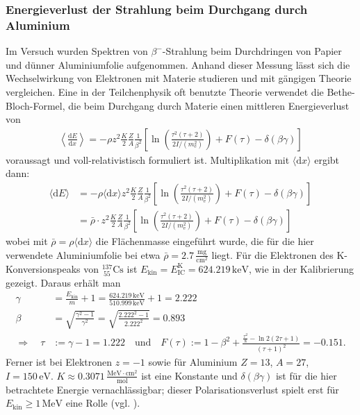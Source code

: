 \documentclass[german,  %
parskip=full,  %
]{scrartcl}
\begin{document}
\subsubsection{Energieverlust der Strahlung beim Durchgang durch Aluminium}
Im Versuch wurden Spektren von \(\beta^-\)-Strahlung beim Durchdringen von Papier und dünner Aluminiumfolie aufgenommen. Anhand dieser Messung lässt sich die Wechselwirkung von Elektronen mit Materie studieren und mit gängigen Theorie vergleichen. Eine in der Teilchenphysik oft benutzte Theorie verwendet die Bethe-Bloch-Formel, die beim Durchgang durch Materie einen mittleren Energieverlust von
\begin{align*}
\left \langle \frac{\mathrm{d}E}{\mathrm{d} x} \right \rangle= -\rho
z^2 \frac{K}{2} \frac{Z}{A} \frac{1}{\beta^2} \left[ \ln \left(\frac{\tau^2(\tau+2)}{2I/(m_{\mathrm{e}}^2)}\right)+F(\tau)- \delta(\beta \gamma)\right]
\end{align*}
voraussagt und voll-relativistisch formuliert ist. Multiplikation mit \(\langle\mathrm{d}x\rangle\) ergibt dann:
\begin{align*}
\langle \mathrm{d}E  \rangle &= -\rho\langle\mathrm{d} x\rangle 
z^2 \frac{K}{2} \frac{Z}{A} \frac{1}{\beta^2} \left[ \ln \left(\frac{\tau^2(\tau+2)}{2I/(m_{\mathrm{e}}^2)}\right)+F(\tau)- \delta(\beta \gamma)\right] \\
&= \bar{\rho}\cdot 
z^2 \frac{K}{2} \frac{Z}{A} \frac{1}{\beta^2} \left[ \ln \left(\frac{\tau^2(\tau+2)}{2I/(m_{\mathrm{e}}^2)}\right)+F(\tau)- \delta(\beta \gamma)\right] 
\end{align*}
wobei mit \(\bar{\rho}=\rho\langle\mathrm{d} x\rangle \) die Flächenmasse eingeführt wurde, die für die hier verwendete Aluminiumfolie bei etwa \(\bar{\rho} = 2.7\,\frac{\mathrm{mg}}{\mathrm{cm}^2}\) liegt. Für die Elektronen des K-Konversionspeaks von \(^{137}_{\ 55}\mathrm{Cs}\) ist \(E_{\mathrm{kin}}= E^\mathrm{K}_{\mathrm{IC}} = 624.219\,\mathrm{keV}\), wie in der Kalibrierung gezeigt. Daraus erhält man
\begin{align*}
\gamma &= \frac{E_{\mathrm{kin}}}{m} + 1 = \frac{624.219\,\mathrm{keV}}{510.999\,\mathrm{keV}} + 1 = 2.222 \\
\beta &= \sqrt{\frac{\gamma^2 - 1}{\gamma^2}} = \sqrt{\frac{2.222^2 - 1}{2.222^2}} = 0.893 \\
\Longrightarrow\quad \tau &:= \gamma -1 = 1.222\quad\text{und}\quad F(\tau) := 1 - \beta^2 + \frac{\frac{\tau^2}{8} - \ln 2(2\tau+1)}{(\tau + 1)^2} = -0.151.
\end{align*}
Ferner ist bei Elektronen \(z=-1\) sowie für Aluminium \(Z=13\), \(A=27\), \(I=150\,\mathrm{eV}\). \(K\approx0.3071\,\frac{\mathrm{MeV}\cdot\mathrm{cm^2}}{\mathrm{mol}}\) ist eine Konstante und \(\delta(\beta\gamma)\) ist für die hier betrachtete Energie vernachlässigbar; dieser Polarisationsverlust spielt erst für \(E_{\mathrm{kin}} \geq 1\,\mathrm{MeV}\) eine Rolle (vgl. \cite{Anleitung}). 
\end{document}
